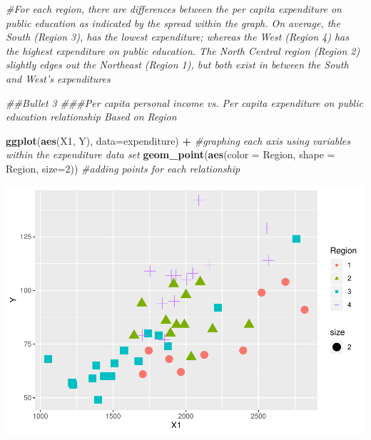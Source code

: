 \documentclass[]{article}
\newenvironment{Shaded}{\begin{snugshade}}{\end{snugshade}}
\newcommand{\CommentTok}[1]{\textcolor[rgb]{0.56,0.35,0.01}{\textit{#1}}}
\newcommand{\DataTypeTok}[1]{\textcolor[rgb]{0.13,0.29,0.53}{#1}}
\newcommand{\DecValTok}[1]{\textcolor[rgb]{0.00,0.00,0.81}{#1}}
\newcommand{\KeywordTok}[1]{\textcolor[rgb]{0.13,0.29,0.53}{\textbf{#1}}}
\newcommand{\NormalTok}[1]{#1}
\newcommand{\OperatorTok}[1]{\textcolor[rgb]{0.81,0.36,0.00}{\textbf{#1}}}
\newcommand{\StringTok}[1]{\textcolor[rgb]{0.31,0.60,0.02}{#1}}
\begin{document}
\begin{Shaded}
\begin{Highlighting}[]
\CommentTok{#For each region, there are differences between the per capita expenditure on public education as indicated by the spread within the graph. On average, the South (Region 3), has the lowest expenditure; whereas the West (Region 4) has the highest expenditure on public education. The North Central region (Region 2) slightly edges out the Northeast (Region 1), but both exist in between the South and West's expenditures}

\CommentTok{##Bullet 3}
\CommentTok{###Per capita personal income vs. Per capita expenditure on public education relationship Based on Region}

\KeywordTok{ggplot}\NormalTok{(}\KeywordTok{aes}\NormalTok{(X1, Y), }\DataTypeTok{data=}\NormalTok{expenditure) }\OperatorTok{+}\StringTok{ }\CommentTok{#graphing each axis using variables within the expenditure data set}
\StringTok{  }\KeywordTok{geom_point}\NormalTok{(}\KeywordTok{aes}\NormalTok{(}\DataTypeTok{color =}\NormalTok{ Region, }\DataTypeTok{shape =}\NormalTok{ Region, }\DataTypeTok{size=}\DecValTok{2}\NormalTok{)) }\CommentTok{#adding points for each relationship}
\end{Highlighting}
\end{Shaded}

\includegraphics{Problem-Set-Answers_files/figure-latex/unnamed-chunk-1-5.pdf}
\end{document}
